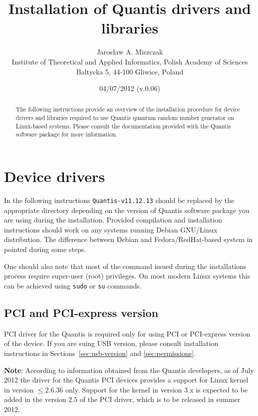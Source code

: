 \documentclass[a4paper,11pt]{article}
\title{Installation of Quantis drivers and libraries}
\author{Jaros{\l}aw A. Miszczak\\
Institute of Theoretical and Applied Informatics, Polish Academy of Sciences\\
Baltycka 5, 44-100 Gliwice, Poland}
\date{04/07/2012 (v.0.06)}
\providecommand{\note}[1]{\vspace{6pt}\noindent\textbf{Note}: #1\vspace{6pt}}
\newcommand{\QuantisDistVersion}{Quantis-v11.12.13}
\begin{document}
\maketitle

\begin{abstract}
The following instructions provide an overview of the installation procedure for
device drivers and libraries required to use Quantis quantum random number
generator on Linux-based systems. Please consult the documentation provided with
the Quantis software package for more information.
\end{abstract}

\section{Device drivers}

In the following instructions \texttt{\QuantisDistVersion } should be replaced
by the appropriate directory depending on the version of Quantis software
package you are using during the installation. Provided compilation and
installation instructions should work on any systems running Debian GNU/Linux
distribution. The difference between Debian and Fedora/RedHat-based system in
pointed during some steps.

One should also note that most of the command issued during the installations
process require super-user (root) privileges. On most modern Linux systems
this can be achieved using \texttt{sudo} or \texttt{su} commands.

\subsection{PCI and PCI-express version}
PCI driver for the Quantis is required only for using PCI or PCI-express version
of the device. If you are suing USB version, please consult installation
instructions in Sections~\ref{sec:usb-version} and \ref{sec:permissions}.

\note{According to information obtained from the Quantis developers, as of July
2012 the driver for the Quantis PCI devices provides a support for Linux kernel
in version $\leq 2.6.36$ only. Support for the kernel in version 3.x is expected
to be added in the version 2.5 of the PCI driver, which is to be released in
summer 2012.}
\end{document}
